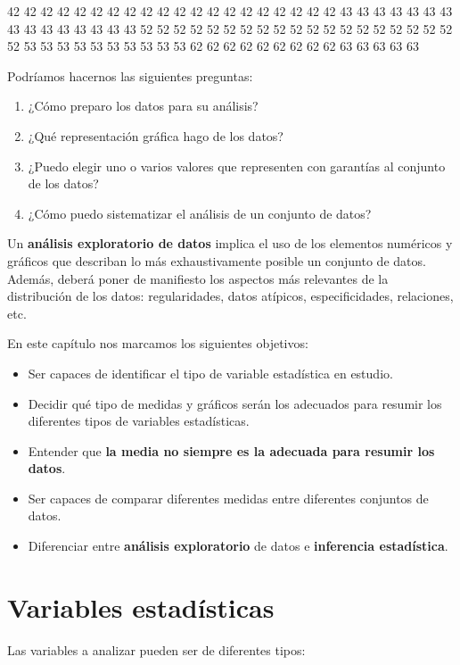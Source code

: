 \documentclass[]{book}
\theoremstyle{definition}
\theoremstyle{definition}
\theoremstyle{definition}
\theoremstyle{remark}
\begin{document}
42 42 42 42 42 42 42 42 42 42 42 42 42 42 42 42 42 42 42 42 43 43 43 43
43 43 43 43 43 43 43 43 43 43 43 52 52 52 52 52 52 52 52 52 52 52 52 52
52 52 52 52 52 52 52 53 53 53 53 53 53 53 53 53 53 62 62 62 62 62 62 62
62 62 63 63 63 63 63

Podríamos hacernos las siguientes preguntas:

\begin{enumerate}
\def\labelenumi{\arabic{enumi}.}
\item
  ¿Cómo preparo los datos para su análisis?
\item
  ¿Qué representación gráfica hago de los datos?
\item
  ¿Puedo elegir uno o varios valores que representen con garantías al
  conjunto de los datos?
\item
  ¿Cómo puedo sistematizar el análisis de un conjunto de datos?
\end{enumerate}

Un \textbf{análisis exploratorio de datos} implica el uso de los
elementos numéricos y gráficos que describan lo más exhaustivamente
posible un conjunto de datos. Además, deberá poner de manifiesto los
aspectos más relevantes de la distribución de los datos: regularidades,
datos atípicos, especificidades, relaciones, etc.

En este capítulo nos marcamos los siguientes objetivos:

\begin{itemize}
\item
  Ser capaces de identificar el tipo de variable estadística en estudio.
\item
  Decidir qué tipo de medidas y gráficos serán los adecuados para
  resumir los diferentes tipos de variables estadísticas.
\item
  Entender que \textbf{la media no siempre es la adecuada para resumir
  los datos}.
\item
  Ser capaces de comparar diferentes medidas entre diferentes conjuntos
  de datos.
\item
  Diferenciar entre \textbf{análisis exploratorio} de datos e
  \textbf{inferencia estadística}.
\end{itemize}

\section{Variables estadísticas}\label{variables-estadisticas}

Las variables a analizar pueden ser de diferentes tipos:
\end{document}
